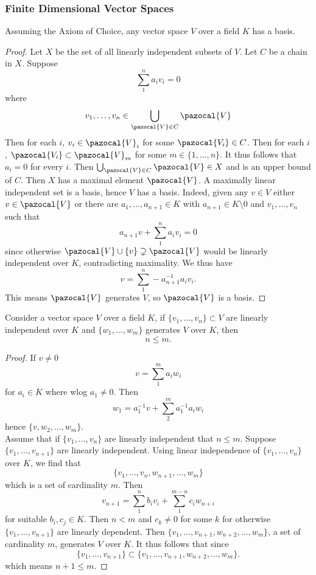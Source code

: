 \subsubsection{Finite Dimensional Vector Spaces}
\begin{lemma}
    Assuming the Axiom of Choice, any vector space $V$ over a field $K$ has a basis.
\end{lemma}
\begin{proof}
    Let $X$ be the set of all linearly independent subsets of $V$. Let $C$ be a chain in $X$. Suppose 
    $$
        \sum_1^n a_i v_i=0 
    $$
    where 
    $$
        v_1,\dots,v_n\in \bigcup_{\pazocal{V}\in C} \pazocal{V}
    $$
    Then for each $i$, $v_i \in \pazocal{V}_i$ for some $\pazocal{V_i}\in C$. Then for each $i$, $\pazocal{V_i}\subset \pazocal{V}_m$ for some $m\in \{1,\dots,n\}$. It thus follows that $a_i = 0$ for every $i$. Then 
    $\bigcup_{\pazocal{V}\in C}\pazocal{V}\in X$ and is an upper bound of $C$. Then $X$ has a maximal element $\pazocal{V}$. A maximally linear independent set is a basis, hence $V$ has a basis. Indeed, given any $v\in V$ either $v\in \pazocal{V}$ or there are $a_1,\dots,a_{n+1}\in K$ with $a_{n+1}\in K\setminus0$ and $v_1,\dots,v_n$ such that 
    $$
        a_{n+1}v+ \sum_1^n a_i v_i = 0
    $$
    since otherwise $\pazocal{V}\cup \{v\}\supsetneq \pazocal{V}$ would be linearly independent over $K$, contradicting maximality. We thus have  
    $$
        v = \sum_1^n -a_{n+1}^{-1}a_iv_i.
    $$
    This means $\pazocal{V}$ generates $V$, so $\pazocal{V}$ is a basis. 
\end{proof}
\begin{lemma}
    Consider a vector space $V$ over a field $K$, if $\{v_1,\dots,v_n\}\subset V$ are linearly independent over $K$ and $\{w_1,\dots,w_m\}$ generates $V$ over $K$, then 
    $$
        n\leq m.
    $$
\end{lemma}
\begin{proof}
     If $v\neq 0$ 
     $$
        v = \sum_1^m a_i w_i
     $$
     for $a_i\in K$ where wlog $a_1 \neq 0$. Then 
     $$
        w_1 = a_1^{-1}v+\sum_2^m a_1^{-1}a_i w_i 
     $$
     hence $\{v,w_2,\dots,w_m\}$.\\
     Assume that if $\{v_1,\dots,v_n\}$ are linearly independent that $n\leq m$. Suppose $\{v_1,\dots,v_{n+1}\}$ are linearly independent. Using linear independence of $\{v_1,\dots,v_n\}$ over $K$, we find that 
     $$
        \{v_1,\dots,v_n,w_{n+1},\dots,w_{m}\}
     $$
     which is a set of cardinality $m$. Then 
     $$
        v_{n+1} = \sum_1^n b_i v_i + \sum_{1}^{m-n} c_iw_{n+i}
     $$
    for suitable $b_i,c_j\in K$. Then $n<m$ and $c_k\neq 0$ for some $k$ for otherwise $\{v_1,\dots,v_{n+1}\}$ are linearly dependent. Then $\{v_1,\dots,v_{n+1},w_{n+2},\dots,w_{m}\}$, a set of cardinality $m$, generates $V$ over $K$. It thus follows that since 
    $$
        \{v_1,\dots,v_{n+1}\}\subset \{v_1,\dots,v_{n+1},w_{n+2},\dots,w_{m}\}.
    $$
    which means $n+1\leq m$.
\end{proof}
